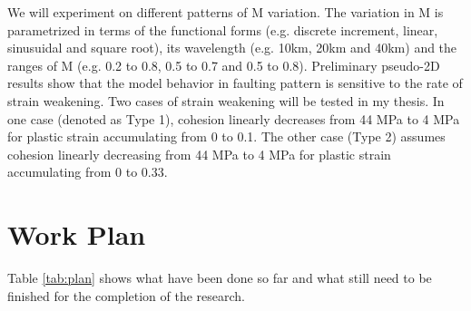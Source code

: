 \documentclass[12pt]{article}
\begin{document}
We will experiment on different patterns of M variation. The variation in M is parametrized in terms of the functional forms (e.g. discrete increment, linear, sinusuidal and square root), its wavelength (e.g. 10km, 20km and 40km) and the ranges of M (e.g. 0.2 to 0.8, 0.5 to 0.7 and 0.5 to 0.8). Preliminary pseudo-2D results show that the model behavior in faulting pattern is sensitive to the rate of strain weakening. Two cases of strain weakening will be tested in my thesis. In one case (denoted as Type 1), cohesion linearly decreases from 44 MPa to 4 MPa for plastic strain accumulating from 0 to 0.1. The other case (Type 2) assumes cohesion linearly decreasing from 44 MPa to 4 MPa for plastic strain accumulating from 0 to 0.33.




\break
\section{Work Plan}
\label{ch:plan}

Table \ref{tab:plan} shows what have been done so far and what still need to be finished for the completion of the research.
\end{document}
